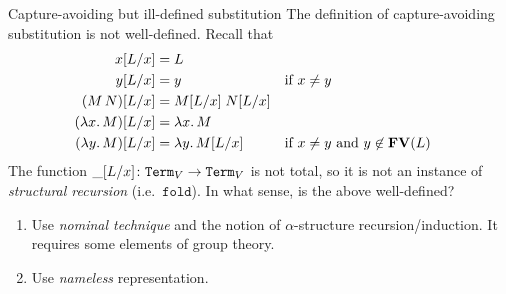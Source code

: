 \begin{frame}{Capture-avoiding but ill-defined substitution}
  The definition of capture-avoiding substitution is not well-defined.
  Recall that
    \begin{align*}
      x[{L}/{x}] & = L \\
      y[{L}/{x}] & = y && \text{if $x \neq y$} \\
      (M\, N)[{L}/{x}] & = M[{L}/{x}]\; N[{L}/{x}] \\
      (\lambda x.\, M)[{L}/{x}] & = \lambda x.\, M \\
      (\lambda y.\, M)[{L}/{x}] & = \lambda y.\, M[{L}/{x}]                                 &&\text{if $x \neq y$ and $y \not\in \mathbf{FV}(L)$}
    \end{align*}
    The function $\_[{L}/{x}]\colon \mathtt{Term}_V \to \mathtt{Term}_V$ is not total, so it is \alert{not} an instance of \emph{structural recursion} (i.e.\ $\texttt{fold}$).
    In what sense, is the above well-defined? 
    
  \begin{enumerate}
    \item Use \emph{nominal technique} and the notion of $\alpha$-structure recursion/induction.
      It requires some elements of group theory.
    \item Use \emph{nameless} representation.
  \end{enumerate}
  
\end{frame}

